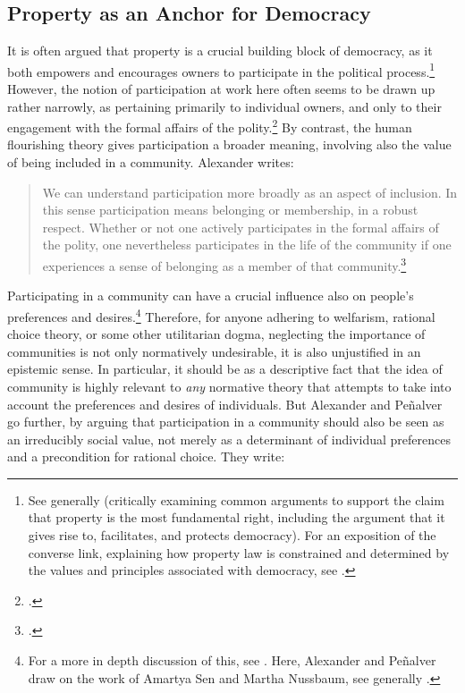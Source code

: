\subsection{Property as an Anchor for Democracy}\label{sec:2:5:2}

It is often argued that property is a crucial building block of democracy, as it both empowers and encourages owners to participate in the political process.\footnote{See generally \cite{rose96} (critically examining common arguments to support the claim that property is the most fundamental right, including the argument that it gives rise to, facilitates, and protects democracy). For an exposition of the converse link, explaining how property law is constrained and determined by the values and principles associated with democracy, see \cite{singer14}.} However, the notion of participation at work here often seems to be drawn up rather narrowly, as pertaining primarily to individual owners, and only to their engagement with the formal affairs of the polity.\footcite[1275]{alexander14} By contrast, the human flourishing theory gives participation a broader meaning, involving also the value of being included in a community. Alexander writes:

\begin{quote}
We can understand participation more broadly as an aspect of inclusion. In this sense participation means belonging or membership, in a robust respect. Whether or not one actively participates in the formal affairs of the polity, one nevertheless participates in the life of the community if one experiences a sense of belonging as a member of that community.\footcite[1275]{alexander14}
\end{quote}

Participating in a community can have a crucial influence also on people's preferences and desires.\footnote{For a more in depth discussion of this, see \cite[140]{alexander09}. Here, Alexander and Pe\~{n}alver draw on the work of Amartya Sen and Martha Nussbaum, see generally \cite{sen84,sen85,sen99,nussbaum00,nussbaum02}.} Therefore, for anyone adhering to welfarism, rational choice theory, or some other utilitarian dogma, neglecting the importance of communities is not only normatively undesirable, it is also unjustified in an epistemic sense. In particular, it should be  as a descriptive fact that the idea of community is highly relevant to {\it any} normative theory that attempts to take into account the preferences and desires of individuals. But Alexander and Pe\~{n}alver go further, by arguing that participation in a community should also be seen as an irreducibly social value, not merely as a determinant of individual preferences and a precondition for rational choice. They write:

